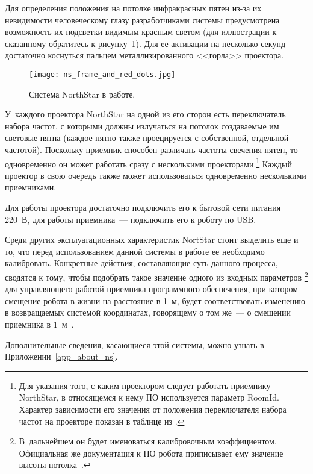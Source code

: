 Для определения положения на потолке инфракрасных пятен из-за их невидимости человеческому глазу разработчиками системы предусмотрена возможность их подсветки видимым красным светом (для иллюстрации к сказанному обратитесь к рисунку~\ref{img_NSs_coordinate_system}).
Для ее активации на несколько секунд достаточно коснуться пальцем металлизированного <<горла>> проектора.

\begin{figure}[h]
	\centering
	\texttt{[image: ns\_frame\_and\_red\_dots.jpg]}
	\caption{Система NorthStar в работе.}
	\label{img_NSs_coordinate_system}
\end{figure}

У~каждого проектора NorthStar на одной из его сторон есть переключатель набора частот, с которыми должны излучаться на потолок создаваемые им световые пятна (каждое пятно также проецируется с собственной, отдельной частотой).
Поскольку приемник способен различать частоты свечения пятен, то одновременно он может работать сразу с несколькими проекторами\lefteqn.\footnote{Для указания того, с каким проектором следует работать приемнику NorthStar, в относящемся к нему ПО используется параметр RoomId. Характер зависимости его значения от положения переключателя набора частот на проекторе показан в таблице из \cite[стр.~25]{northstar_manual}.}
Каждый проектор в свою очередь также может использоваться одновременно несколькими приемниками.

Для работы проектора достаточно подключить его к бытовой сети питания 220~В, для работы приемника~--- подключить его к роботу по USB.

Среди других эксплуатационных характеристик NortStar стоит выделить еще и то, что перед использованием данной системы в работе ее необходимо калибровать.
Конкретные действия, составляющие суть данного процесса, сводятся к тому, чтобы подобрать такое значение одного из входных параметров%
\footnote{В~дальнейшем он будет именоваться калибровочным коэффициентом. Официальная же документация к ПО робота приписывает ему значение высоты потолка~\cite{set_ceiling_cal_doc}.}
для управляющего работой приемника программного обеспечения, при котором смещение робота в жизни на расстояние в 1~м, будет соответствовать изменению в возвращаемых системой координатах, говорящему о том же~--- о смещении приемника в 1~м~\cite[стр.~30]{northstar_manual}.

Дополнительные сведения, касающиеся этой системы, можно узнать в Приложении~\ref{app_about_ns}.



